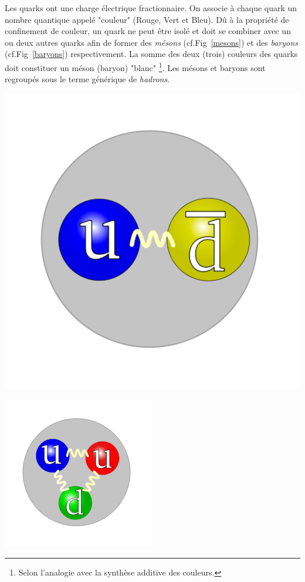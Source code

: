 Les quarks ont une charge électrique fractionnaire. On associe à chaque quark un nombre quantique appelé "couleur" (Rouge, Vert et Bleu). Dû à la propriété de confinement de couleur, un quark ne peut être isolé et doit se combiner avec un ou deux autres quarks afin de former des \textit{mésons} (cf.Fig~\ref{mesons}) et des \textit{baryons} (cf.Fig~\ref{baryons}) respectivement. La somme des deux (trois) couleurs des quarks doit constituer un méson (baryon) "blanc" \footnote{Selon l'analogie avec la synthèse additive des couleurs.}. Les mésons et baryons sont regroupés sous le terme générique de \textit{hadrons}.

\marginpar
{
	\centering
	\includegraphics[width=\marginparwidth]{SM/quarks2.png}
	\label{mesons}
}

\marginpar
{
	\centering
    \includegraphics[width=\marginparwidth]{SM/quarks.png}
    \label{baryons}
}
	
